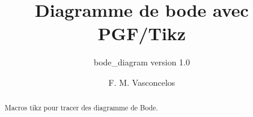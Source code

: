 \documentclass[a4paper,11pt]{article}
\title{Diagramme de bode avec PGF/Tikz}
\subtitle{bode\_diagram version 1.0}
\author{F. M. Vasconcelos}
\date{}
\begin{document}
\maketitle
\begin{abstract}
Macros tikz pour tracer des diagramme de Bode. 
\end{abstract}
\begin{center}
\end{center}

\begin{center}
\end{center}
\end{document}

